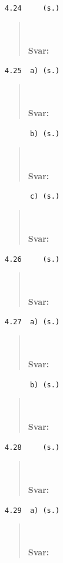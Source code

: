 \documentclass[a4paper]{article}
\newcommand{\tskcol}[1]{\textcolor{tskcol}{#1}}
\begin{document}
\texttt{\tskcol{4.24~~~~ (s.)}}
\begin{quotation}
	\noindent
	\\ \\
	\textbf{Svar:}
\end{quotation}

\texttt{\tskcol{4.25~~a) (s.)}}
\begin{quotation}
	\noindent
	\\ \\
	\textbf{Svar:}
\end{quotation}

\texttt{\tskcol{~~~~~~b) (s.)}}
\begin{quotation}
	\noindent
	\\ \\
	\textbf{Svar:}
\end{quotation}

\texttt{\tskcol{~~~~~~c) (s.)}}
\begin{quotation}
	\noindent
	\\ \\
	\textbf{Svar:}
\end{quotation}

\texttt{\tskcol{4.26~~~~ (s.)}}
\begin{quotation}
	\noindent
	\\ \\
	\textbf{Svar:}
\end{quotation}

\texttt{\tskcol{4.27~~a) (s.)}}
\begin{quotation}
	\noindent
	\\ \\
	\textbf{Svar:}
\end{quotation}

\texttt{\tskcol{~~~~~~b) (s.)}}
\begin{quotation}
	\noindent
	\\ \\
	\textbf{Svar:}
\end{quotation}

\texttt{\tskcol{4.28~~~~ (s.)}}
\begin{quotation}
	\noindent
	\\ \\
	\textbf{Svar:}
\end{quotation}

\texttt{\tskcol{4.29~~a) (s.)}}
\begin{quotation}
	\noindent
	\\ \\
	\textbf{Svar:}
\end{quotation}
\end{document}
